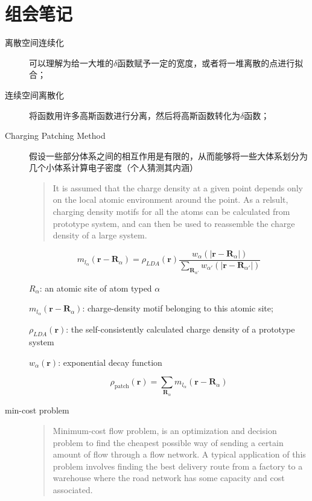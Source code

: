 \section{组会笔记}
\begin{description}
	\item[离散空间连续化]
		可以理解为给一大堆的$\delta$函数赋予一定的宽度，或者将一堆离散的点进行拟合；

	\item[连续空间离散化]将函数用许多高斯函数进行分离，然后将高斯函数转化为$\delta$函数；

	\item[Charging Patching Method] 假设一些部分体系之间的相互作用是有限的，从而能够将一些大体系划分为几个小体系计算电子密度（个人猜测其内涵）

	\begin{quote}
	It is assumed that the charge density at a given point depends only on the local atomic environment around the point. As a relsult, charging density motifs for all the atoms can be calculated from prototype system, and can then be used to reassemble the charge density of a large system.
	\end{quote}

	\begin{equation}
	m_{l_\alpha} (\textbf{r}-\textbf{R}_\alpha) = \rho_{LDA}(\textbf{r}) \frac{w_\alpha(|\textbf{r}-\textbf{R}_\alpha|)}{\sum_{\textbf{R}_{\alpha'}}w_{\alpha'}(|\textbf{r}-\textbf{R}_{\alpha'}|)}
	\end{equation}

	\footnotesize

	$R_\alpha$: an atomic site of atom typed $\alpha$

	$m_{l_\alpha}(\textbf{r}-\textbf{R}_\alpha)$: charge-density motif belonging to this atomic site;

	$\rho_{LDA}(\textbf{r})$: the self-consistently calculated charge density of a prototype system

	$w_\alpha(\textbf{r})$: exponential decay function

	\normalsize

	\begin{equation}
	\rho_{\text{patch}}(\textbf{r})=\sum_{\textbf{R}_\alpha} m_{l_\alpha}(\textbf{r}-\textbf{R}_\alpha)
	\end{equation}

	\item[min-cost problem] 

	\begin{quote}
	Minimum-cost flow problem, is an optimization and decision problem to find the cheapest possible way of sending a certain amount of flow through a flow network. A typical application of this problem involves finding the best delivery route from a factory to a warehouse where the road network has some capacity and cost associated.


\end{quote}
\end{description}
